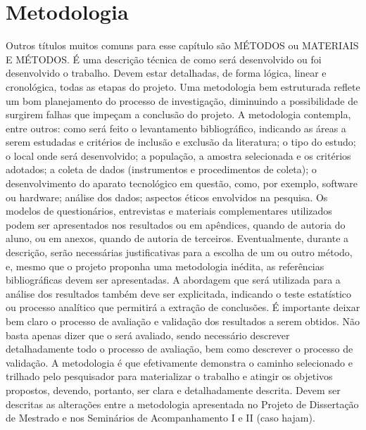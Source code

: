 \chapter{Metodologia}
\label{chap:metod}

Outros títulos muitos comuns para esse capítulo são MÉTODOS ou MATERIAIS E MÉTODOS.
É uma descrição técnica de como será desenvolvido ou foi desenvolvido o trabalho. Devem estar detalhadas, de forma lógica, linear e cronológica, todas as etapas do projeto.
Uma metodologia bem estruturada reflete um bom planejamento do processo de investigação, diminuindo a possibilidade de surgirem falhas que impeçam a conclusão do projeto.
A metodologia contempla, entre outros: como será feito o levantamento bibliográfico, indicando as áreas a serem estudadas e critérios de inclusão e exclusão da literatura; o tipo do estudo; o local onde será desenvolvido; a população, a amostra selecionada e os critérios adotados; a coleta de dados (instrumentos e procedimentos de coleta); o desenvolvimento do aparato tecnológico em questão, como, por exemplo, software ou hardware; análise dos dados; aspectos éticos envolvidos na pesquisa. Os modelos de questionários, entrevistas e materiais complementares utilizados podem ser apresentados nos resultados ou em apêndices, quando de autoria do aluno, ou em anexos, quando de autoria de terceiros.
Eventualmente, durante a descrição, serão necessárias justificativas para a escolha de um ou outro método, e, mesmo que o projeto proponha uma metodologia inédita, as referências bibliográficas devem ser apresentadas.
A abordagem que será utilizada para a análise dos resultados também deve ser explicitada, indicando o teste estatístico ou processo analítico que permitirá a extração de conclusões.
É importante deixar bem claro o processo de avaliação e validação dos resultados a serem obtidos. Não basta apenas dizer que o será avaliado, sendo necessário descrever detalhadamente todo o processo de avaliação, bem como descrever o processo de validação.
A metodologia é que efetivamente demonstra o caminho selecionado e trilhado pelo pesquisador para materializar o trabalho e atingir os objetivos propostos, devendo, portanto, ser clara e detalhadamente descrita.
Devem ser descritas as alterações entre a metodologia apresentada no Projeto de Dissertação de Mestrado e nos Seminários de Acompanhamento I e II (caso hajam).
